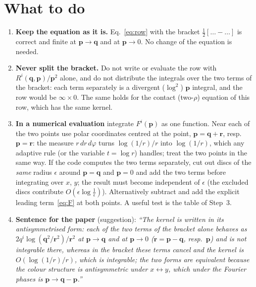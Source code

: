 \documentclass[11pt]{article}
\newcommand{\vq}{\mathbf{q}}
\newcommand{\vp}{\mathbf{p}}
\newcommand{\vr}{\mathbf{r}}
\begin{document}
\section{What to do}
\begin{enumerate}
\item \textbf{Keep the equation as it is.} Eq.~\eqref{eq:row} with the bracket $\frac12[\dots-\dots]$ is correct and finite at $\vp\to\vq$ and at $\vp\to0$. No change of the equation is needed.
\item \textbf{Never split the bracket.} Do not write or evaluate the row with $R^{i}(\vq,\vp)/\vp^{2}$ alone, and do not distribute the integrals over the two terms of the bracket: each term separately is a divergent ($\log^{2}$) $\vp$ integral, and the row would be $\infty\times0$. The same holds for the contact (two-$\rho$) equation of this row, which has the same kernel.
\item \textbf{In a numerical evaluation} integrate $F^{i}(\vp)$ as one function. Near each of the two points use polar coordinates centred at the point, $\vp=\vq+\vr$, resp.\ $\vp=\vr$: the measure $r\,dr\,d\varphi$ turns $\log(1/r)/r$ into $\log(1/r)$, which any adaptive rule (or the variable $t=\log r$) handles; treat the two points in the same way. If the code computes the two terms separately, cut out discs of the \emph{same} radius $\epsilon$ around $\vp=\vq$ and $\vp=0$ and add the two terms before integrating over $x$, $y$; the result must become independent of $\epsilon$ (the excluded discs contribute $O(\epsilon\log\frac1\epsilon)$). Alternatively subtract and add the explicit leading term~\eqref{eq:F} at both points. A useful test is the table of Step~3.
\item \textbf{Sentence for the paper} (suggestion): \emph{``The kernel is written in its antisymmetrised form: each of the two terms of the bracket alone behaves as $2q^{i}\log(\mathbf{q}^{2}/\mathbf{r}^{2})/\mathbf{r}^{2}$ at $\mathbf{p}\to\mathbf{q}$ and at $\mathbf{p}\to0$ ($\mathbf{r}=\mathbf{p}-\mathbf{q}$, resp.\ $\mathbf{p}$) and is not integrable there, whereas in the bracket these terms cancel and the kernel is $O(\log(1/r)/r)$, which is integrable; the two forms are equivalent because the colour structure is antisymmetric under $x\leftrightarrow y$, which under the Fourier phases is $\mathbf{p}\to\mathbf{q}-\mathbf{p}$.''}
\end{enumerate}
\end{document}
